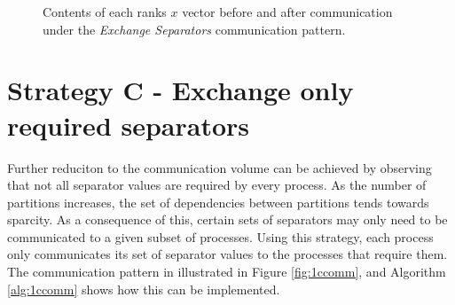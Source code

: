 \begin{figure}[H]
    \centering
    \caption{Contents of each ranks \(x\) vector before and after communication under the \textit{Exchange Separators} communication pattern.}
    \label{fig:1bcomm}
\end{figure}






\section{Strategy C - Exchange only required separators}
Further reduciton to the communication volume can be achieved by observing that not all separator values are required by every process. As the number of partitions increases, the set of dependencies between partitions tends towards sparcity. As a consequence of this, certain sets of separators may only need to be communicated to a given subset of processes. Using this strategy, each process only communicates its set of separator values to the processes that require them. The communication pattern in illustrated in Figure \ref{fig:1ccomm}, and Algorithm \autoref{alg:1ccomm} shows how this can be implemented.

